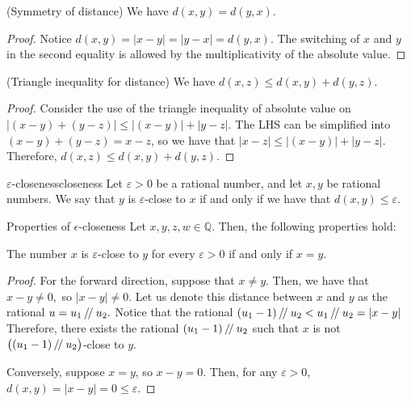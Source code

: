 \begin{proposition}
    (Symmetry of distance) We have $d(x, y) = d(y, x).$
\end{proposition}
\begin{proof}
    Notice $d(x, y) = \lvert x - y \rvert = \lvert y - x \rvert = d(y, x).$ 
    The switching of $x$ and $y$ in the second equality is allowed by the multiplicativity of the absolute value. 
\end{proof}

\begin{proposition}
    (Triangle inequality for distance) We have $d(x, z) \leq d(x, y) + d(y, z).$
\end{proposition}

\begin{proof}
    Consider the use of the triangle inequality of absolute value on $|(x - y) + (y - z)| \leq |(x- y)| + |y - z|$.
    The LHS can be simplified into $(x - y) + (y - z) = x - z$, so we have that $|x - z| \leq |(x- y)| + |y - z|.$
    Therefore, $d(x, z) \leq d(x, y) + d(y, z).$
\end{proof}

\begin{definition}{$\varepsilon$-closeness}{closeness}
    Let $\varepsilon > 0$ be a rational number, and let $x, y$ be rational numbers.
    We say that $y$ is $\varepsilon$-close to $x$ if and only if we have that $d(x, y) \leq \varepsilon.$
\end{definition}
\begin{problem}{Properties of $\epsilon$-closeness}
Let $x, y, z, w \in \mathbb{Q}$. Then, the following properties hold:
\end{problem}
\begin{proposition}
    The number $x$ is $\varepsilon$-close to $y$ for every $\varepsilon > 0$ if and only if  $x = y$.
\end{proposition} 
\begin{proof}
    For the forward direction, suppose that $x \neq y.$
    Then, we have that $x - y \neq 0,$ so $\lvert x - y \rvert \neq 0.$ 
    Let us denote this distance between $x$ and $y$ as the rational $u = u_1 \, \textrm{/}\!\textrm{/} \: u_2.$
    Notice that the rational $(u_1 - 1) \, \textrm{/}\!\textrm{/} \: u_2 < u_1 \, \textrm{/}\!\textrm{/} \: u_2 = \lvert x - y \rvert$
    Therefore, there exists the rational $(u_1 - 1) \, \textrm{/}\!\textrm{/} \: u_2$ such that $x$ is not $\big( (u_1 - 1) \, \textrm{/}\!\textrm{/} \: u_2 \big)$-close to $y$. 

    Conversely, suppose $x = y$, so $x - y = 0.$
    Then, for any $\varepsilon > 0$, $d(x, y) = \lvert x - y \rvert = 0 \leq \varepsilon.$
\end{proof}

